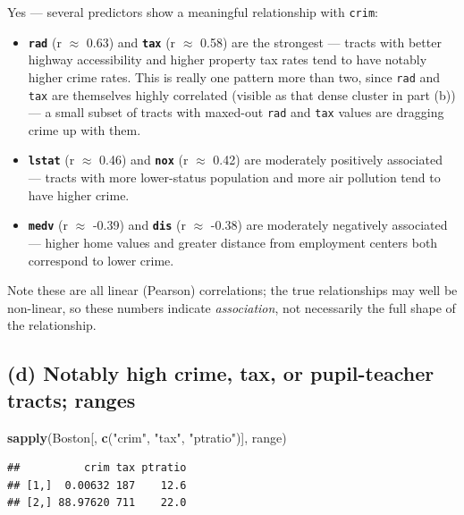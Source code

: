 \documentclass[
  11pt,
]{article}
\newenvironment{Shaded}{\begin{snugshade}}{\end{snugshade}}
\newcommand{\FunctionTok}[1]{\textcolor[rgb]{0.13,0.29,0.53}{\textbf{#1}}}
\newcommand{\NormalTok}[1]{#1}
\newcommand{\StringTok}[1]{\textcolor[rgb]{0.31,0.60,0.02}{#1}}
\providecommand{\tightlist}{%
  \setlength{\itemsep}{0pt}\setlength{\parskip}{0pt}}
\begin{document}
Yes --- several predictors show a meaningful relationship with
\texttt{crim}:

\begin{itemize}
\tightlist
\item
  \textbf{\texttt{rad}} (r \(\approx\) 0.63) and \textbf{\texttt{tax}}
  (r \(\approx\) 0.58) are the strongest --- tracts with better highway
  accessibility and higher property tax rates tend to have notably
  higher crime rates. This is really one pattern more than two, since
  \texttt{rad} and \texttt{tax} are themselves highly correlated
  (visible as that dense cluster in part (b)) --- a small subset of
  tracts with maxed-out \texttt{rad} and \texttt{tax} values are
  dragging crime up with them.
\item
  \textbf{\texttt{lstat}} (r \(\approx\) 0.46) and \textbf{\texttt{nox}}
  (r \(\approx\) 0.42) are moderately positively associated --- tracts
  with more lower-status population and more air pollution tend to have
  higher crime.
\item
  \textbf{\texttt{medv}} (r \(\approx\) -0.39) and \textbf{\texttt{dis}}
  (r \(\approx\) -0.38) are moderately negatively associated --- higher
  home values and greater distance from employment centers both
  correspond to lower crime.
\end{itemize}

Note these are all linear (Pearson) correlations; the true relationships
may well be non-linear, so these numbers indicate \emph{association},
not necessarily the full shape of the relationship.

\subsection{(d) Notably high crime, tax, or pupil-teacher tracts;
ranges}\label{d-notably-high-crime-tax-or-pupil-teacher-tracts-ranges}

\begin{Shaded}
\begin{Highlighting}[]
\FunctionTok{sapply}\NormalTok{(Boston[, }\FunctionTok{c}\NormalTok{(}\StringTok{"crim"}\NormalTok{, }\StringTok{"tax"}\NormalTok{, }\StringTok{"ptratio"}\NormalTok{)], range)}
\end{Highlighting}
\end{Shaded}

\begin{verbatim}
##          crim tax ptratio
## [1,]  0.00632 187    12.6
## [2,] 88.97620 711    22.0
\end{verbatim}
\end{document}
